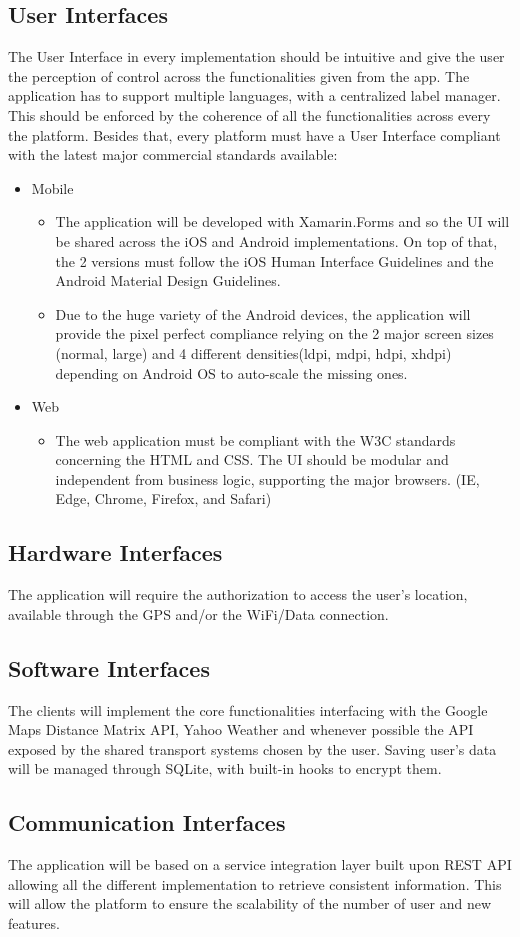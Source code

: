 \subsection{User Interfaces}

The User Interface in every implementation should be intuitive and give the user the perception of control across the functionalities given from the app. 
The application has to support multiple languages, with a centralized label manager.
This should be enforced by the coherence of all the functionalities across every the platform.
Besides that, every platform must have a User Interface compliant with the latest major commercial standards available:
\begin{itemize}
\item Mobile
\begin{itemize}
\item The application will be developed with Xamarin.Forms and so the UI will be shared across the iOS and Android implementations. On top of that, the 2 versions must follow the iOS Human Interface Guidelines and the Android Material Design Guidelines.
\item Due to the huge variety of the Android devices, the application will provide the pixel perfect compliance relying on the 2 major screen sizes (normal, large) and 4 different densities(ldpi, mdpi, hdpi, xhdpi) depending on Android OS to auto-scale the missing ones.
\end{itemize}

\item Web
\begin{itemize}
\item The web application must be compliant with the W3C standards concerning the HTML and CSS. The UI should be modular and independent from business logic, supporting the major browsers. (IE, Edge, Chrome, Firefox, and Safari)
\end{itemize}
\end{itemize}

\subsection{Hardware Interfaces}
The application will require the authorization to access the user’s location, available through the GPS and/or the WiFi/Data connection. 

\subsection{Software Interfaces}
The clients will implement the core functionalities interfacing with the Google Maps Distance Matrix API, Yahoo Weather and whenever possible the API exposed by the shared transport systems chosen by the user. 
Saving user's data will be managed through SQLite, with built-in hooks to encrypt them.

\subsection{Communication Interfaces}
The application will be based on a service integration layer built upon REST API allowing all the different implementation to retrieve consistent information. 
This will allow the platform to ensure the scalability of the number of user and new features.
